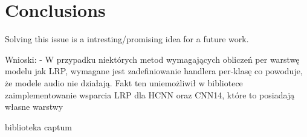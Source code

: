 \documentclass[
    bindingoffset=5mm,  %
    footnoteindent=3mm, %
    hyphenation=true    %
]{src/wut-thesis}
\begin{document}
%
%
\clearpage %
\section{Conclusions} \label{ch:summary}

Solving this issue is a intresting/promising idea for a future work.

Wnioski:
- W przypadku niektórych metod wymagających obliczeń per warstwę modelu jak LRP,
  wymagane jest zadefiniowanie handlera per-klasę co powoduje, że modele audio
  nie działają. Fakt ten uniemożliwił w bibliotece zaimplementowanie wsparcia
  LRP dla HCNN oraz CNN14, które to posiadają własne warstwy

biblioteka captum

\cleardoublepage %
\printbibliography
\clearpage

\acronymlist
{}
\vspace{0.8cm}

\pagestyle{plain}

\listoffigurestoc    %
\vspace{1cm}         %
\listoftablestoc     %
\vspace{1cm}         %
\listofappendicestoc %


\captionsetup[figure]{list=no}
\captionsetup[table]{list=no}

\clearpage
\end{document}
